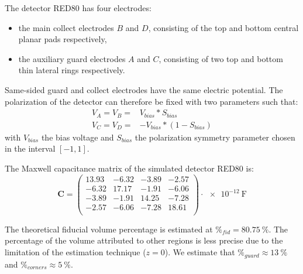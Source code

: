 The detector RED80 has four electrodes:
\begin{itemize}
	\item the main collect electrodes $B$ and $D$, consisting of the top and bottom central planar pads respectively,
	\item the auxiliary guard electrodes $A$ and $C$, consisting of two top and bottom thin lateral rings respectively. 
\end{itemize}
Same-sided guard and collect electrodes have the same electric potential. The polarization of the detector can therefore be fixed with two parameters such that:
\begin{equation}
\begin{array}{cc}
V_A = V_B = & V_{bias} * S_{bias} \\
V_C = V_D = & - V_{bias} * \left( 1 - S_{bias} \right)
\end{array}
\end{equation}
with $V_{bias}$ the bias voltage and $S_{bias}$ the polarization symmetry parameter chosen in the interval $\left[ -1, 1 \right]$.

The Maxwell capacitance matrix of the simulated detector RED80 is:
\begin{equation}
\bm{C} = 
\begin{pmatrix}
  13.93 & -6.32 & -3.89 & -2.57\\
  -6.32 & 17.17 & -1.91 & -6.06\\
  -3.89 & -1.91 & 14.25 & -7.28\\
  -2.57 & -6.06 & -7.28 & 18.61\\
\end{pmatrix}
\cdot \SI{e-12}{\farad}
\end{equation}

The theoretical fiducial volume percentage is estimated at $\%_{fid}=\SI{80.75}{\percent}$. The percentage of the volume attributed to other regions is less precise due to the limitation of the estimation technique ($z=0$). We estimate that $\%_{guard} \approx \SI{13}{\percent}$ and $\%_{corners} \approx \SI{5}{\percent}$.

